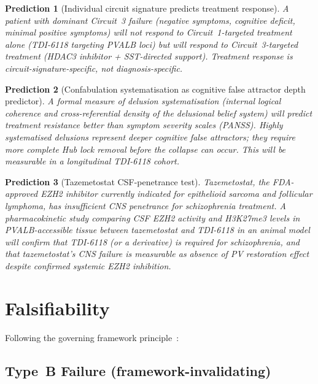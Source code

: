 \documentclass[12pt,a4paper]{article}
\newtheorem{prediction}{Prediction}
\begin{document}
\begin{prediction}[Individual circuit signature predicts
treatment response]
\label{pred:indiv}
A patient with dominant Circuit~3 failure (negative symptoms,
cognitive deficit, minimal positive symptoms) will not
respond to Circuit~1-targeted treatment alone (TDI-6118
targeting PVALB loci) but will respond to Circuit~3-targeted
treatment (HDAC3 inhibitor + SST-directed support). Treatment
response is circuit-signature-specific, not diagnosis-specific.
\end{prediction}

\begin{prediction}[Confabulation systematisation as
cognitive false attractor depth predictor]
\label{pred:depth}
A formal measure of delusion systematisation (internal
logical coherence and cross-referential density of the
delusional belief system) will predict treatment resistance
better than symptom severity scales (PANSS). Highly
systematised delusions represent deeper cognitive false
attractors; they require more complete Hub lock removal
before the collapse can occur. This will be measurable in
a longitudinal TDI-6118 cohort.
\end{prediction}

\begin{prediction}[Tazemetostat CSF-penetrance test]
\label{pred:tazem}
Tazemetostat, the FDA-approved EZH2 inhibitor currently
indicated for epithelioid sarcoma and follicular lymphoma,
has insufficient CNS penetrance for schizophrenia treatment.
A pharmacokinetic study comparing CSF EZH2 activity and
H3K27me3 levels in PVALB-accessible tissue between
tazemetostat and TDI-6118 in an animal model will confirm
that TDI-6118 (or a derivative) is required for
schizophrenia, and that tazemetostat's CNS failure is
measurable as absence of PV restoration effect despite
confirmed systemic EZH2 inhibition.
\end{prediction}

\section{Falsifiability}

Following the governing framework
principle~\cite{FalsThm2026}:

\subsection{Type~B Failure (framework-invalidating)}
\end{document}
